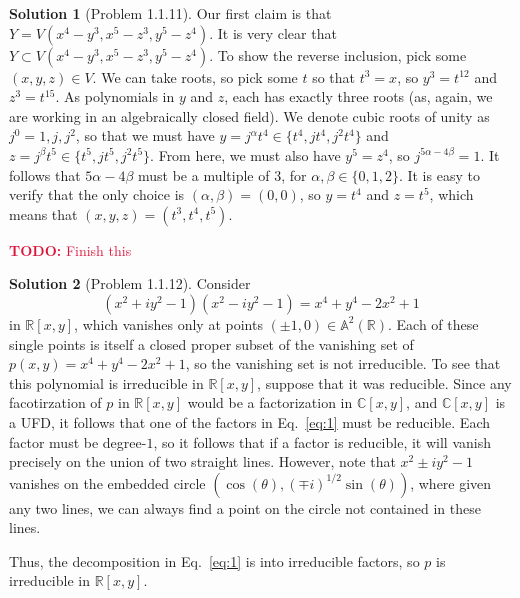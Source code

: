 \documentclass[aps,pra,showpacs,notitlepage,onecolumn,superscriptaddress,nofootinbib]{revtex4-1}
\newcommand{\pop}[1]{\textcolor{crimson}{#1}}
\theoremstyle{definition}
\newtheorem{solution}{Solution}[section]
\begin{document}
\begin{solution}[Problem 1.1.11]
  Our first claim is that $Y = V(x^4 - y^3, x^5 - z^3, y^5 - z^4)$. It is very clear that $Y \subset V(x^4 - y^3, x^5 - z^3, y^5 - z^4)$. To show the reverse inclusion, pick some $(x, y, z) \in V$.
  We can take roots, so pick some $t$ so that $t^3 = x$, so $y^3 = t^{12}$ and $z^3 = t^{15}$. As polynomials in $y$ and $z$, each has exactly three roots (as, again, we are working in an algebraically closed field).
  We denote cubic roots of unity as $j^0 = 1, j, j^2$, so that we must have $y = j^{\alpha} t^4 \in \{ t^4, j t^4, j^2 t^4\}$ and $z = j^{\beta} t^5 \in \{t^5, j t^5, j^2 t^5\}$. From here, we must also have
  $y^5 = z^4$, so $j^{5 \alpha - 4 \beta} = 1$. It follows that $5 \alpha - 4 \beta$ must be a multiple of $3$, for $\alpha, \beta \in \{0, 1, 2\}$. It is easy to verify that the only choice is $(\alpha, \beta) = (0, 0)$,
  so $y = t^4$ and $z = t^5$, which means that $(x, y, z) = (t^3, t^4, t^5)$.

  \pop{\textbf{TODO:} Finish this}
\end{solution}

\begin{solution}[Problem 1.1.12]
  Consider
  \begin{equation}
    \label{eq:1}
    (x^2 + i y^2 - 1)(x^2 - iy^2 - 1) = x^4 + y^4 - 2x^2 + 1
    \end{equation}
  in $\mathbb{R}[x, y]$, which vanishes only at points $(\pm 1, 0) \in \mathbb{A}^2(\mathbb{R})$. Each of these single points is itself a closed proper subset of the vanishing
  set of $p(x, y) = x^4 + y^4 - 2x^2 + 1$, so the vanishing set is not irreducible. To see that this polynomial is irreducible in $\mathbb{R}[x, y]$, suppose that it was reducible.
  Since any facotirzation of $p$ in $\mathbb{R}[x, y]$ would be a factorization in $\mathbb{C}[x, y]$, and $\mathbb{C}[x, y]$ is a UFD, it follows that one of the factors in Eq.~\eqref{eq:1}
  must be reducible. Each factor must be degree-$1$, so it follows that if a factor is reducible, it will vanish precisely on the union of two straight lines. However, note that $x^2 \pm i y^2 - 1$
  vanishes on the embedded circle $(\cos(\theta), (\mp i)^{1/2} \sin(\theta))$, where given any two lines, we can always find a point on the circle not contained in these lines.

  Thus, the decomposition in Eq.~\eqref{eq:1} is into irreducible factors, so $p$ is irreducible in $\mathbb{R}[x, y]$.
  \end{solution}
\end{document}

